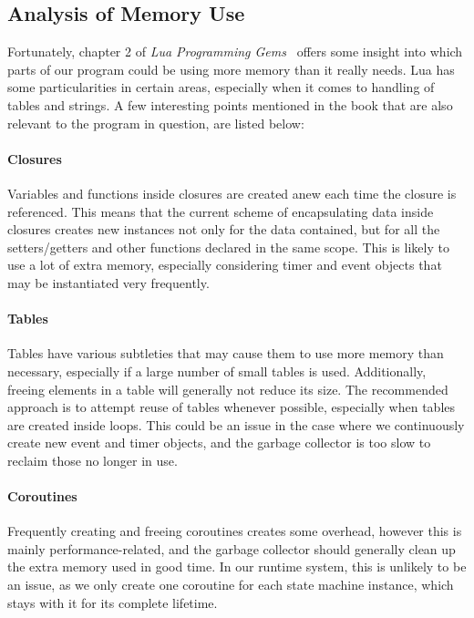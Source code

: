 \subsection{Analysis of Memory Use}
\label{sec:memory_analysis}
Fortunately, chapter 2 of \emph{Lua Programming Gems}~\cite{book:lua_programming_gems} offers some insight into which parts of our program could be using more memory than it really needs. Lua has some particularities in certain areas, especially when it comes to handling of tables and strings. A few interesting points mentioned in the book that are also relevant to the program in question, are listed below:

\paragraph{Closures} Variables and functions inside closures are created anew each time the closure is referenced. This means that the current scheme of encapsulating data inside closures creates new instances not only for the data contained, but for all the setters/getters and other functions declared in the same scope. This is likely to use a lot of extra memory, especially considering timer and event objects that may be instantiated very frequently.

\paragraph{Tables} Tables have various subtleties that may cause them to use more memory than necessary, especially if a large number of small tables is used. Additionally, freeing elements in a table will generally not reduce its size. The recommended approach is to attempt reuse of tables whenever possible, especially when tables are created inside loops. This could be an issue in the case where we continuously create new event and timer objects, and the garbage collector is too slow to reclaim those no longer in use.

\paragraph{Coroutines} Frequently creating and freeing coroutines creates some overhead, however this is mainly performance-related, and the garbage collector should generally clean up the extra memory used in good time. In our runtime system, this is unlikely to be an issue, as we only create one coroutine for each state machine instance, which stays with it for its complete lifetime.

